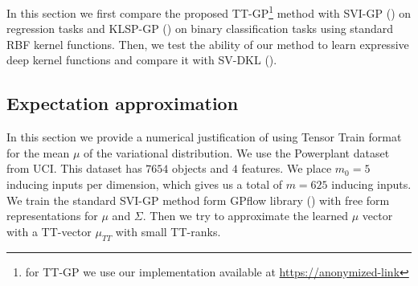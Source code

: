 In this section we first compare the proposed TT-GP\footnote{for TT-GP we use our implementation available at
\url{https://anonymized-link}} method with SVI-GP (\citet{hensman2013}) on regression tasks and KLSP-GP
(\citet{hensman2015}) on binary classification tasks using standard RBF kernel
functions. Then, we test the ability of our method to learn
expressive deep kernel functions and compare it with SV-DKL
(\citet{wilson2016stochastic}).

\subsection{Expectation approximation}

In this section we provide a numerical justification of using Tensor Train
format for the mean $\mu$ of the variational distribution. We use the Powerplant
dataset from UCI. This dataset has $7654$ objects and $4$ features. We place 
$m_0 = 5$ inducing inputs per dimension, which gives us a total of $m = 625$
inducing inputs. We train the standard SVI-GP method form GPflow library
(\citet{GPflow2016}) with free form representations for $\mu$ and $\Sigma$.
Then we try to approximate the learned $\mu$ vector with a TT-vector 
$\mu_{TT}$ with small TT-ranks. 

